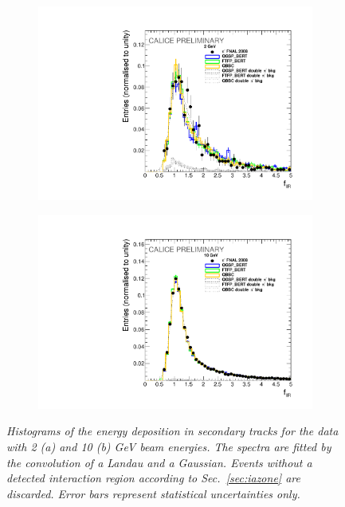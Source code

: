 \begin{figure}[H]
	\centering
	\begin{subfigure}{0.5\textwidth}
		\centering
		\includegraphics[width=.90\linewidth]{ECAL/plots/calibrationfit-2.pdf}
		\caption{\label{fig:calib2} }
	\end{subfigure}%
	\begin{subfigure}{0.5\textwidth}
		\centering
		\includegraphics[width=.90\linewidth]{ECAL/plots/calibrationfit-10.pdf}
		\caption{\label{fig:calib10} }
	\end{subfigure}
	\caption{\label{fig:calib} \sl Histograms of the energy deposition in secondary tracks for the data with 2 (a) and 10 (b) GeV beam energies. The spectra are fitted by the convolution of a Landau and a Gaussian. Events without a detected interaction region according to Sec.~\ref{sec:iazone} are discarded. Error bars represent statistical uncertainties only.}
\end{figure}

